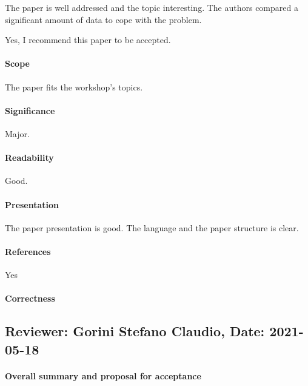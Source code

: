 \documentclass{jhps}
\begin{document}
The paper is well addressed and the topic interesting. The authors compared a significant amount of data to cope with the problem.

Yes, I recommend this paper to be accepted.

\paragraph{Scope}   %

The paper fits the workshop’s topics.

\paragraph{Significance}   %

Major.

\paragraph{Readability}   %

Good.

\paragraph{Presentation}

The paper presentation is good. The language and the paper structure is clear.

\paragraph{References}   %

Yes

\paragraph{Correctness}   %


\subsection*{Reviewer: Gorini Stefano Claudio, Date: 2021-05-18}

\paragraph{Overall summary and proposal for acceptance}
\end{document}
